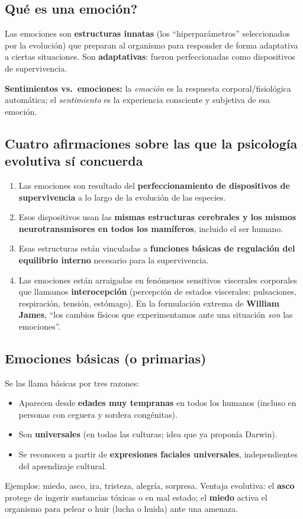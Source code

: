 \documentclass[11pt, a4paper]{article}
\begin{document}
\subsection{\textquestiondown Qu\'e es una emoci\'on?}

Las emociones son \textbf{estructuras innatas} (los ``hiperpar\'ametros'' seleccionados por la evoluci\'on) que preparan al organismo para responder de forma adaptativa a ciertas situaciones. Son \textbf{adaptativas}: fueron perfeccionadas como dispositivos de supervivencia.

\textbf{Sentimientos vs.\ emociones:} la \emph{emoci\'on} es la respuesta corporal/fisiol\'ogica autom\'atica; el \emph{sentimiento} es la experiencia consciente y subjetiva de esa emoci\'on.

\subsection{Cuatro afirmaciones sobre las que la psicolog\'ia evolutiva s\'i concuerda}

\begin{enumerate}[nosep]
    \item Las emociones son resultado del \textbf{perfeccionamiento de dispositivos de supervivencia} a lo largo de la evoluci\'on de las especies.
    \item Esos dispositivos usan las \textbf{mismas estructuras cerebrales y los mismos neurotransmisores en todos los mam\'iferos}, incluido el ser humano.
    \item Esas estructuras est\'an vinculadas a \textbf{funciones b\'asicas de regulaci\'on del equilibrio interno} necesario para la supervivencia.
    \item Las emociones est\'an arraigadas en fen\'omenos sensitivos viscerales corporales que llamamos \textbf{interocepci\'on} (percepci\'on de estados viscerales: pulsaciones, respiraci\'on, tensi\'on, est\'omago). En la formulaci\'on extrema de \textbf{William James}, ``los cambios f\'isicos que experimentamos ante una situaci\'on \emph{son} las emociones''.
\end{enumerate}

\subsection{Emociones b\'asicas (o primarias)}

Se las llama b\'asicas por tres razones:
\begin{itemize}[nosep]
    \item Aparecen desde \textbf{edades muy tempranas} en todos los humanos (incluso en personas con ceguera y sordera cong\'enitas).
    \item Son \textbf{universales} (en todas las culturas; idea que ya propon\'ia Darwin).
    \item Se reconocen a partir de \textbf{expresiones faciales universales}, independientes del aprendizaje cultural.
\end{itemize}
Ejemplos: miedo, asco, ira, tristeza, alegr\'ia, sorpresa. Ventaja evolutiva: el \textbf{asco} protege de ingerir sustancias t\'oxicas o en mal estado; el \textbf{miedo} activa el organismo para pelear o huir (lucha o huida) ante una amenaza.
\end{document}
